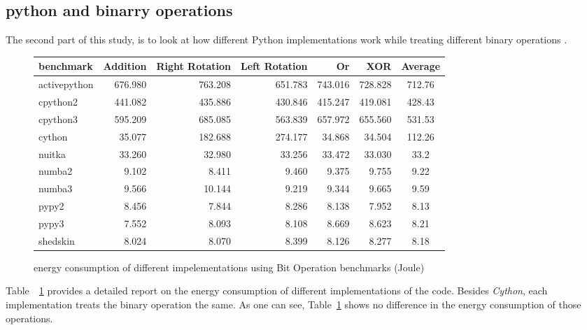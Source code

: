 

\subsection{python and binarry operations }
The second part of this study, is to look at how different Python implementations work while treating different binary operations .


\begin{figure}[!hbt]
    \begin{tabular}{|lrrrrr|c|}
        \toprule
        benchmark    & Addition & Right Rotation & Left Rotation & Or      & XOR     & Average \\
        \midrule
        activepython & 676.980  & 763.208        & 651.783       & 743.016 & 728.828 & 712.76  \\
        cpython2     & 441.082  & 435.886        & 430.846       & 415.247 & 419.081 & 428.43  \\
        cpython3     & 595.209  & 685.085        & 563.839       & 657.972 & 655.560 & 531.53  \\
        \hline
        cython       & 35.077   & 182.688        & 274.177       & 34.868  & 34.504  & 112.26  \\
        nuitka       & 33.260   & 32.980         & 33.256        & 33.472  & 33.030  & 33.2    \\
        \hline
        numba2       & 9.102    & 8.411          & 9.460         & 9.375   & 9.755   & 9.22    \\
        numba3       & 9.566    & 10.144         & 9.219         & 9.344   & 9.665   & 9.59    \\
        pypy2        & 8.456    & 7.844          & 8.286         & 8.138   & 7.952   & 8.13    \\
        pypy3        & 7.552    & 8.093          & 8.108         & 8.669   & 8.623   & 8.21    \\
        shedskin     & 8.024    & 8.070          & 8.399         & 8.126   & 8.277   & 8.18    \\
        \bottomrule
    \end{tabular}
    \caption{energy consumption of different impelementations using Bit Operation benchmarks (Joule) }
    \label{table:bitops}
\end{figure}


Table~~\ref{table:bitops} provides a detailed report on the energy consumption of different implementations of the code.
Besides \emph{Cython}, each implementation treats the binary operation the same. As one can see, Table~\ref{table:bitops} shows no difference in the energy consumption of those operations.

